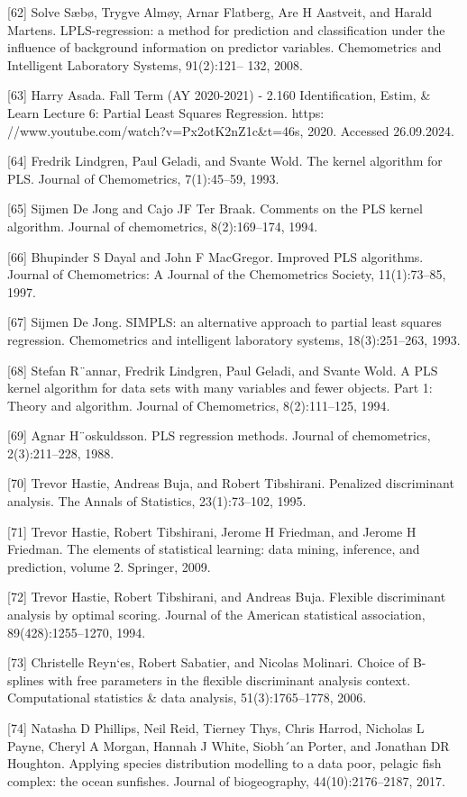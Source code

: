 \documentclass[preprint,12pt]{elsarticle}
\begin{document}
[62] Solve Sæbø, Trygve Almøy, Arnar Flatberg, Are H Aastveit, and Harald Martens. LPLS-regression: a method for prediction and classification under the influence of background information on predictor variables. Chemometrics and Intelligent Laboratory Systems, 91(2):121– 132, 2008. 

[63] Harry Asada. Fall Term (AY 2020-2021) - 2.160 Identification, Estim, & Learn Lecture 6: Partial Least Squares Regression. https: //www.youtube.com/watch?v=Px2otK2nZ1c&t=46s, 2020. Accessed 26.09.2024. 

[64] Fredrik Lindgren, Paul Geladi, and Svante Wold. The kernel algorithm for PLS. Journal of Chemometrics, 7(1):45–59, 1993. 

[65] Sijmen De Jong and Cajo JF Ter Braak. Comments on the PLS kernel algorithm. Journal of chemometrics, 8(2):169–174, 1994. 

[66] Bhupinder S Dayal and John F MacGregor. Improved PLS algorithms. Journal of Chemometrics: A Journal of the Chemometrics Society, 11(1):73–85, 1997. 

[67] Sijmen De Jong. SIMPLS: an alternative approach to partial least squares regression. Chemometrics and intelligent laboratory systems, 18(3):251–263, 1993. 

[68] Stefan R¨annar, Fredrik Lindgren, Paul Geladi, and Svante Wold. A PLS kernel algorithm for data sets with many variables and fewer objects. Part 1: Theory and algorithm. Journal of Chemometrics, 8(2):111–125, 1994. 

[69] Agnar H¨oskuldsson. PLS regression methods. Journal of chemometrics, 2(3):211–228, 1988. 

[70] Trevor Hastie, Andreas Buja, and Robert Tibshirani. Penalized discriminant analysis. The Annals of Statistics, 23(1):73–102, 1995. 

[71] Trevor Hastie, Robert Tibshirani, Jerome H Friedman, and Jerome H Friedman. The elements of statistical learning: data mining, inference, and prediction, volume 2. Springer, 2009. 

[72] Trevor Hastie, Robert Tibshirani, and Andreas Buja. Flexible discriminant analysis by optimal scoring. Journal of the American statistical association, 89(428):1255–1270, 1994. 

[73] Christelle Reyn`es, Robert Sabatier, and Nicolas Molinari. Choice of B-splines with free parameters in the flexible discriminant analysis context. Computational statistics & data analysis, 51(3):1765–1778, 2006. 

[74] Natasha D Phillips, Neil Reid, Tierney Thys, Chris Harrod, Nicholas L Payne, Cheryl A Morgan, Hannah J White, Siobh´an Porter, and Jonathan DR Houghton. Applying species distribution modelling to a data poor, pelagic fish complex: the ocean sunfishes. Journal of biogeography, 44(10):2176–2187, 2017. 
\end{document}
